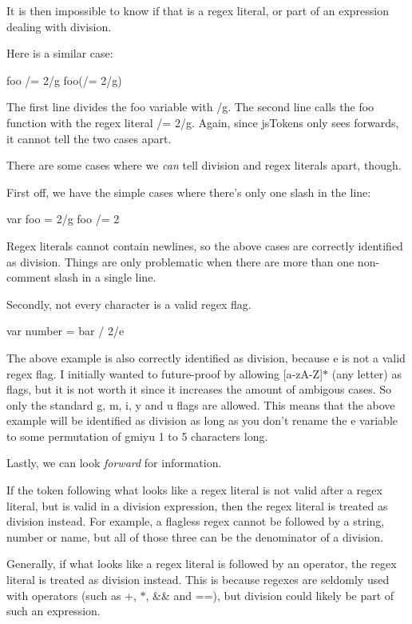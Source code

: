It is then impossible to know if that is a regex literal, or part of an expression dealing with division.

Here is a similar case\+:


\begin{DoxyCode}
foo /= 2/g
foo(/= 2/g)
\end{DoxyCode}


The first line divides the {\ttfamily foo} variable with {/g}. The second line calls the {\ttfamily foo} function with the regex literal {\ttfamily /= 2/g}. Again, since {\ttfamily js\+Tokens} only sees forwards, it cannot tell the two cases apart.

There are some cases where we {\itshape can} tell division and regex literals apart, though.

First off, we have the simple cases where there’s only one slash in the line\+:


\begin{DoxyCode}
var foo = 2/g
foo /= 2
\end{DoxyCode}


Regex literals cannot contain newlines, so the above cases are correctly identified as division. Things are only problematic when there are more than one non-\/comment slash in a single line.

Secondly, not every character is a valid regex flag.


\begin{DoxyCode}
var number = bar / 2/e
\end{DoxyCode}


The above example is also correctly identified as division, because {\ttfamily e} is not a valid regex flag. I initially wanted to future-\/proof by allowing {\ttfamily \mbox{[}a-\/z\+A-\/Z\mbox{]}$\ast$} (any letter) as flags, but it is not worth it since it increases the amount of ambigous cases. So only the standard {\ttfamily g}, {\ttfamily m}, {\ttfamily i}, {\ttfamily y} and {\ttfamily u} flags are allowed. This means that the above example will be identified as division as long as you don’t rename the {\ttfamily e} variable to some permutation of {\ttfamily gmiyu} 1 to 5 characters long.

Lastly, we can look {\itshape forward} for information.


\begin{DoxyItemize}
\item If the token following what looks like a regex literal is not valid after a regex literal, but is valid in a division expression, then the regex literal is treated as division instead. For example, a flagless regex cannot be followed by a string, number or name, but all of those three can be the denominator of a division.
\item Generally, if what looks like a regex literal is followed by an operator, the regex literal is treated as division instead. This is because regexes are seldomly used with operators (such as {\ttfamily +}, {\ttfamily $\ast$}, {\ttfamily \&\&} and {\ttfamily ==}), but division could likely be part of such an expression.
\end{DoxyItemize}

